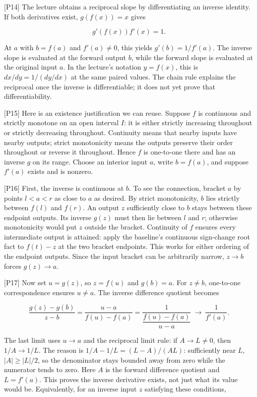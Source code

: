 \documentclass[
  11pt,
]{article}
\providecommand{\lt}{<}
\begin{document}
{[}P14{]} The lecture obtains a reciprocal slope by differentiating an
inverse identity. If both derivatives exist, \(g(f(x))=x\) gives

\[
g'(f(x))f'(x)=1.
\]

At \(a\) with \(b=f(a)\) and \(f'(a)\ne0\), this yields
\(g'(b)=1/f'(a)\). The inverse slope is evaluated at the forward output
\(b\), while the forward slope is evaluated at the original input \(a\).
In the lecture's notation \(y=f(x)\), this is \(dx/dy=1/(dy/dx)\) at the
same paired values. The chain rule explains the reciprocal once the
inverse is differentiable; it does not yet prove that differentiability.

{[}P15{]} Here is an existence justification we can reuse. Suppose \(f\)
is continuous and strictly monotone on an open interval \(I\): it is
either strictly increasing throughout or strictly decreasing throughout.
Continuity means that nearby inputs have nearby outputs; strict
monotonicity means the outputs preserve their order throughout or
reverse it throughout. Hence \(f\) is one-to-one there and has an
inverse \(g\) on its range. Choose an interior input \(a\), write
\(b=f(a)\), and suppose \(f'(a)\) exists and is nonzero.

{[}P16{]} First, the inverse is continuous at \(b\). To see the
connection, bracket \(a\) by points \(l\lt a\lt r\) as close to \(a\) as
desired. By strict monotonicity, \(b\) lies strictly between \(f(l)\)
and \(f(r)\). An output \(z\) sufficiently close to \(b\) stays between
these endpoint outputs. Its inverse \(g(z)\) must then lie between \(l\)
and \(r\); otherwise monotonicity would put \(z\) outside the bracket.
Continuity of \(f\) ensures every intermediate output is attained: apply
the baseline's continuous sign-change root fact to \(f(t)-z\) at the two
bracket endpoints. This works for either ordering of the endpoint
outputs. Since the input bracket can be arbitrarily narrow, \(z\to b\)
forces \(g(z)\to a\).

{[}P17{]} Now set \(u=g(z)\), so \(z=f(u)\) and \(g(b)=a\). For
\(z\ne b\), one-to-one correspondence ensures \(u\ne a\). The inverse
difference quotient becomes

\[
\frac{g(z)-g(b)}{z-b}
=\frac{u-a}{f(u)-f(a)}
=\frac{1}{\dfrac{f(u)-f(a)}{u-a}}
\ \longrightarrow\ \frac1{f'(a)}.
\]

The last limit uses \(u\to a\) and the reciprocal limit rule: if
\(A\to L\ne0\), then \(1/A\to1/L\). The reason is
\(1/A-1/L=(L-A)/(AL)\): sufficiently near \(L\), \(|A|\geq|L|/2\), so
the denominator stays bounded away from zero while the numerator tends
to zero. Here \(A\) is the forward difference quotient and \(L=f'(a)\).
This proves the inverse derivative exists, not just what its value would
be. Equivalently, for an inverse input \(z\) satisfying these
conditions,
\end{document}
